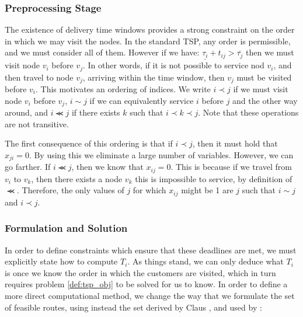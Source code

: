 \subsubsection{Preprocessing Stage}
The existence of delivery time windows provides a strong constraint on the order in which we may visit the nodes. In the standard TSP, any order is permissible, and we must consider all of them. However if we have: $\underline{\tau_i}+t_{ij} > \overline{\tau_j}$ then we must visit node $v_i$ before $v_j$. In other words, if it is not possible to service nod $v_i$, and then travel to node $v_j$, arriving within the time window, then $v_j$ must be visited before $v_i$. This motivates an ordering of indices. We write $i  \prec j$ if we must visit node $v_i$ before $v_j$, $i \sim j$ if we can equivalently service $i$ before $j$ and the other way around, and $i \llcurly j$ if there exists $k$ such that $i \prec k \prec j$. Note that these operations are not transitive.

The first consequence of this ordering is that if $i \prec j$, then it must hold that $x_{ji}=0$. By using this we eliminate a large number of variables. However, we can go farther. If $i \llcurly j$, then we know that $x_{ij}=0$. This is because if we travel from $v_i$ to $v_k$, then there exists a node $v_k$ this is impossible to service, by definition of $\llcurly$. Therefore, the only values of $j$ for which $x_{ij}$ might be 1 are $j$ such that $i\sim j$ and $i \prec j$.

\subsubsection{Formulation and Solution}

In order to define constraints which ensure that these deadlines are met, we must explicitly state how to compute $T_i$. As things stand, we can only deduce what $T_i$ is once we know the order in which the customers are visited, which in turn requires problem \ref{def:tsp_obj} to be solved for us to know. In order to define a more direct computational method, we change the way that we formulate the set of feasible routes, using instead the set derived by Claus \cite{claus1984new}, and used by \cite{zhangrouting}:

